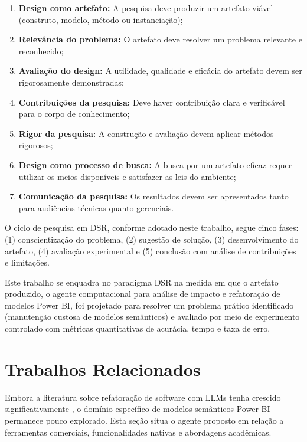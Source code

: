 \documentclass[
    12pt,               %
    openright,          %
    oneside,            %
    a4paper,            %
    chapter=TITLE,      %
    section=TITLE,      %
    brazil              %
]{abntex2}
\begin{document}
\begin{enumerate}
    \item \textbf{Design como artefato:} A pesquisa deve produzir um artefato viável (construto, modelo, método ou instanciação);
    \item \textbf{Relevância do problema:} O artefato deve resolver um problema relevante e reconhecido;
    \item \textbf{Avaliação do design:} A utilidade, qualidade e eficácia do artefato devem ser rigorosamente demonstradas;
    \item \textbf{Contribuições da pesquisa:} Deve haver contribuição clara e verificável para o corpo de conhecimento;
    \item \textbf{Rigor da pesquisa:} A construção e avaliação devem aplicar métodos rigorosos;
    \item \textbf{Design como processo de busca:} A busca por um artefato eficaz requer utilizar os meios disponíveis e satisfazer as leis do ambiente;
    \item \textbf{Comunicação da pesquisa:} Os resultados devem ser apresentados tanto para audiências técnicas quanto gerenciais.
\end{enumerate}

O ciclo de pesquisa em DSR, conforme adotado neste trabalho, segue cinco fases: (1) conscientização do problema, (2) sugestão de solução, (3) desenvolvimento do artefato, (4) avaliação experimental e (5) conclusão com análise de contribuições e limitações.

Este trabalho se enquadra no paradigma DSR na medida em que o artefato produzido, o agente computacional para análise de impacto e refatoração de modelos Power BI, foi projetado para resolver um problema prático identificado (manutenção custosa de modelos semânticos) e avaliado por meio de experimento controlado com métricas quantitativas de acurácia, tempo e taxa de erro.

\section{Trabalhos Relacionados}
\label{sec:trabalhos-relacionados}

Embora a literatura sobre refatoração de software com LLMs tenha crescido significativamente \cite{cordeiro2024llmrefactor, zhang2024staticllm}, o domínio específico de modelos semânticos Power BI permanece pouco explorado. Esta seção situa o agente proposto em relação a ferramentas comerciais, funcionalidades nativas e abordagens acadêmicas.
\end{document}
